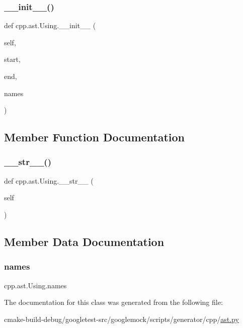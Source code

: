 \subsubsection{\texorpdfstring{\_\_init\_\_()}{\_\_init\_\_()}}
{\footnotesize\ttfamily def cpp.\+ast.\+Using.\+\_\+\+\_\+init\+\_\+\+\_\+ (\begin{DoxyParamCaption}\item[{}]{self,  }\item[{}]{start,  }\item[{}]{end,  }\item[{}]{names }\end{DoxyParamCaption})}



\subsection{Member Function Documentation}
\mbox{\label{classcpp_1_1ast_1_1Using_ac209e8e5d84988d14a8f4b30377e5455}} 
\subsubsection{\texorpdfstring{\_\_str\_\_()}{\_\_str\_\_()}}
{\footnotesize\ttfamily def cpp.\+ast.\+Using.\+\_\+\+\_\+str\+\_\+\+\_\+ (\begin{DoxyParamCaption}\item[{}]{self }\end{DoxyParamCaption})}



\subsection{Member Data Documentation}
\mbox{\label{classcpp_1_1ast_1_1Using_abc05dedb59eb83857d373cc0e64eccb3}} 
\subsubsection{\texorpdfstring{names}{names}}
{\footnotesize\ttfamily cpp.\+ast.\+Using.\+names}



The documentation for this class was generated from the following file\+:\begin{DoxyCompactItemize}
\item 
cmake-\/build-\/debug/googletest-\/src/googlemock/scripts/generator/cpp/\mbox{\hyperlink{ast_8py}{ast.\+py}}\end{DoxyCompactItemize}
